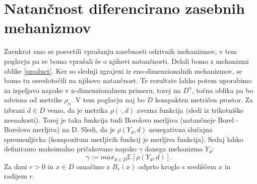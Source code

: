 \documentclass[12pt,a4paper]{amsart}
\theoremstyle{definition} %
\theoremstyle{plain} %
\begin{document}
\section{Natančnost diferencirano zasebnih mehanizmov}
Zaenkrat smo se posvetili vprašanju zasebnosti odzivnih mehanizmov, v tem poglavju pa se bomo vprašali še o njihovi natančnosti. Delali bomo z mehanizmi oblike \eqref{product}. Ker so slednji zgrajeni iz eno-dimenzionalnih mehanizmov, se bomo tu osredotočili na njihovo natančnost. Te rezultate lahko potem uporabimo za izpeljavo napake v n-dimenzionalnem primeru, torej na $D^n$, točna oblika pa bo odvisna od metrike $\rho_n$.
\newline
\newline
V tem poglavju naj bo $D$ kompakten metričen prostor. Za izbrani $d \in D$ vemo, da je metrika $\rho( \cdot , d)$ zvezna funkcija (sledi iz trikotniške neenakosti). Torej je taka funkcija tudi Borelovo merljiva (natančneje Borel - Borelovo merljiva) na D.  Sledi, da je $\rho(Y_d,d)$ nenegativna slučajna spremenljivka (kompozitum merljivih funkcij je merljiva funkcija). Sedaj lahko definiramo maksimalno pričakovano napako $\gamma$ danega mehanizma $Y_d$: $$\gamma := max_{d\in D}\mathbb{E}[\rho(Y_d,d)].$$ Za dani $r > 0$ in $x \in D$ označimo z $B_r(x)$ odprto kroglo s središčem $x$ in radijem $r$.
\end{document}

